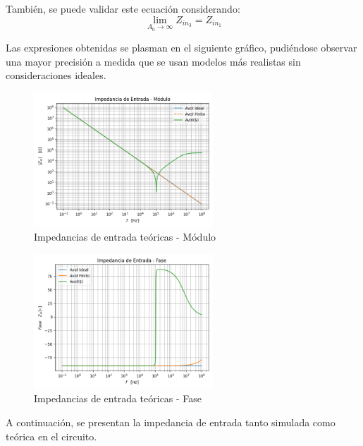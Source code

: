 También, se puede validar este ecuación considerando:
 $$\lim_{A_0\to\infty} Z_{in_3}=Z_{in_1}$$

Las expresiones obtenidas se plasman en el siguiente gráfico, pudiéndose 
observar una mayor precisión a medida que se usan modelos más realistas
sin consideraciones ideales.

\begin{figure}[H]
    \centering
    \includegraphics[width=0.6\textwidth]{../Ejercicio3-CircuitoIntegradoresyDerivadores/Imagenes/Derivador/Zin/impedancia_teo_mag.png}
    \caption{Impedancias de entrada teóricas - Módulo}
\end{figure}
\begin{figure}[H]
    \centering    \includegraphics[width=0.6\textwidth]{../Ejercicio3-CircuitoIntegradoresyDerivadores/Imagenes/Derivador/Zin/impedancia_teo_fase.png}
    \caption{Impedancias de entrada teóricas - Fase}
\end{figure}

A continuación, se presentan la impedancia de entrada tanto simulada como teórica 
en el circuito.



